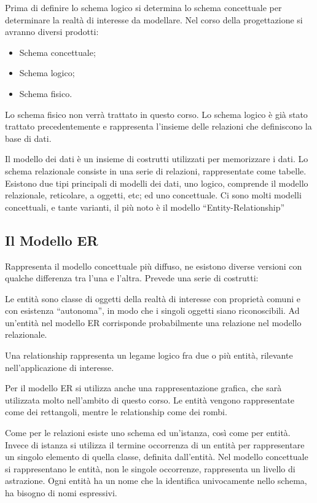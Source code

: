 \documentclass{article}
\numberwithin{equation}{subsection}
\begin{document}
Prima di definire lo schema logico si determina lo schema concettuale per determinare la realtà di interesse da modellare. Nel corso della progettazione si avranno 
diversi prodotti:
\begin{itemize}
    \item Schema concettuale;
    \item Schema logico;
    \item Schema fisico. 
\end{itemize}

Lo schema fisico non verrà trattato in questo corso. Lo schema logico è già stato trattato precedentemente e rappresenta l'insieme delle relazioni che definiscono 
la base di dati. 

Il modello dei dati è un insieme di costrutti utilizzati per memorizzare i dati. Lo schema relazionale consiste in una serie di relazioni, rappresentate come tabelle. 
Esistono due tipi principali di modelli dei dati, uno logico, comprende il modello relazionale, reticolare, a oggetti, etc; ed uno concettuale. 
Ci sono molti modelli concettuali, e tante varianti, il più noto è il modello ``Entity-Relationship''

\subsection{Il Modello ER}

Rappresenta il modello concettuale più diffuso, ne esistono diverse versioni con qualche differenza tra l'una e l'altra. Prevede una serie di costrutti:

Le entità sono classe di oggetti della realtà di interesse con proprietà comuni e con esistenza ``autonoma'', in modo che i singoli oggetti siano riconoscibili. 
Ad un'entità nel modello ER corrisponde probabilmente una relazione nel modello relazionale. 


Una relationship rappresenta un legame logico fra due o più entità, rilevante nell'applicazione di interesse. 

Per il modello ER si utilizza anche una rappresentazione grafica, che sarà utilizzata molto nell'ambito di questo corso. Le entità vengono rappresentate come dei 
rettangoli, mentre le relationship come dei rombi. 


Come per le relazioni esiste uno schema ed un'istanza, così come per entità. Invece di istanza si utilizza il termine occorrenza di un entità per rappresentare un singolo 
elemento di quella classe, definita dall'entità. Nel modello concettuale si rappresentano le entità, non le singole occorrenze, rappresenta un livello di astrazione. 
Ogni entità ha un nome che la identifica univocamente nello schema, ha bisogno di nomi espressivi. 
\end{document}
